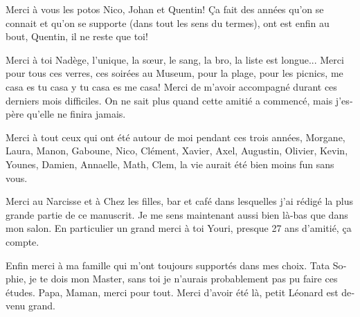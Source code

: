 \documentclass[../main.tex]{subfiles}
\begin{document}
\begin{otherlanguage}{french}
Merci à vous les potos Nico, Johan et Quentin! Ça fait des années qu'on se connait et qu'on se supporte (dans tout les sens du termes), ont est enfin au bout, Quentin, il ne reste que toi!

Merci à toi Nadège, l'unique, la s\oe{}ur, le sang, la bro, la liste est longue... Merci pour tous ces verres, ces soirées au Museum, pour la plage, pour les picnics, me casa es tu casa y tu casa es me casa! Merci de m'avoir accompagné durant ces derniers mois difficiles. On ne sait plus quand cette amitié a commencé, mais j'espère qu'elle ne finira jamais.

Merci à tout ceux qui ont été autour de moi pendant ces trois années, Morgane, Laura, Manon, Gaboune, Nico, Clément, Xavier, Axel, Augustin, Olivier, Kevin, Younes, Damien, Annaelle, Math, Clem, la vie aurait été bien moins fun sans vous.

Merci au Narcisse et à Chez les filles, bar et café dans lesquelles j'ai rédigé la plus grande partie de ce manuscrit. Je me sens maintenant aussi bien là-bas que dans mon salon. En particulier un grand merci à toi Youri, presque 27 ans d'amitié, ça compte.

Enfin merci à ma famille qui m'ont toujours supportés dans mes choix. Tata Sophie, je te dois mon Master, sans toi je n'aurais probablement pas pu faire ces études. Papa, Maman, merci pour tout. Merci d'avoir été là, petit Léonard est devenu grand.



\end{otherlanguage}
\end{document}
